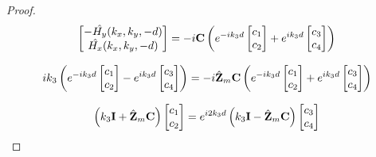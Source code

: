 \begin{proof}
            \begin{equation}
                \begin{bmatrix}
                    -\hat{H_y}(k_x,k_y,-d)\\
                    \hat{H_x}(k_x,k_y,-d)\\
                \end{bmatrix}
                =-i
                \mathbf{C}
                \left(
                    e^{-ik_3 d}
                    \begin{bmatrix}
                        c_1 \\
                        c_2
                    \end{bmatrix}
                    +e^{ik_3 d}
                    \begin{bmatrix}
                        c_3 \\
                        c_4
                    \end{bmatrix}
                \right)
            \end{equation}

            \begin{equation}
                ik_3\left( e^{-ik_3 d}
                \begin{bmatrix}
                    c_1 \\
                    c_2
                \end{bmatrix}
                -e^{ik_3 d}
                \begin{bmatrix}
                    c_3 \\
                    c_4
                \end{bmatrix}
                \right)
                =-i\hat{\mathbf{Z}}_m\mathbf{C}
                \left(
                    e^{-ik_3 d}
                    \begin{bmatrix}
                        c_1 \\
                        c_2
                    \end{bmatrix}
                    +e^{ik_3 d}
                    \begin{bmatrix}
                        c_3 \\
                        c_4
                    \end{bmatrix}
                \right)
            \end{equation}

            \begin{equation}
                \left(k_3\mathbf{I} + \hat{\mathbf{Z}}_m\mathbf{C}\right)
                \begin{bmatrix}
                    c_1 \\
                    c_2
                \end{bmatrix}
                = e^{i2k_3 d} \left(k_3\mathbf{I} - \hat{\mathbf{Z}}_m\mathbf{C}\right)
                \begin{bmatrix}
                    c_3 \\
                    c_4
                \end{bmatrix}
            \end{equation}


\end{proof}
